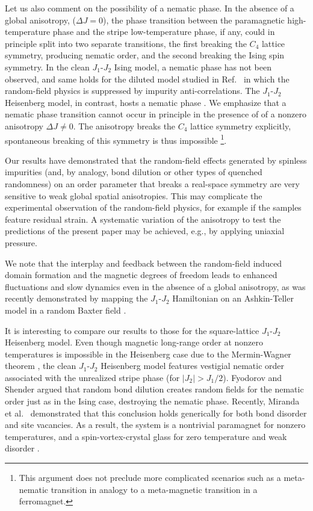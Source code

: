 \documentclass[twocolumn,showpacs,superscriptaddress,aps,prb]{revtex4-2}
\begin{document}
Let us also comment on the possibility of a nematic phase. In the absence of a global anisotropy,
($\Delta J = 0$), the phase transition between the paramagnetic high-temperature phase and the
stripe low-temperature phase, if any, could in principle split into two separate transitions,
the first breaking the $C_4$ lattice symmetry, producing nematic order, and the second breaking the
Ising spin symmetry. In the clean $J_1$-$J_2$ Ising model, a nematic phase has not been observed,
and same holds for the diluted model studied in Ref.\ \cite{KunwarSenVojtaNarayanan18} in which
the random-field physics is suppressed by impurity anti-correlations. The $J_1$-$J_2$ Heisenberg
model, in contrast, hosts a nematic phase \cite{ChandraColemanLarkin90}.
We emphasize that a nematic phase transition cannot occur in principle in the presence of
of a nonzero anisotropy $\Delta J \ne 0$. The anisotropy breaks the $C_4$ lattice symmetry
explicitly, spontaneous breaking of this symmetry is thus impossible \footnote{This argument does not preclude
more complicated scenarios such as a meta-nematic transition in analogy to a meta-magnetic transition
in a ferromagnet.}.

Our results have demonstrated that the random-field effects generated by spinless impurities
(and, by analogy, bond dilution or other types of quenched randomness)
on an order parameter that breaks a real-space symmetry are very sensitive to weak global spatial
anisotropies. This may complicate the experimental observation of the random-field physics, for
example if the samples feature residual strain. A systematic variation of the anisotropy to test the
predictions of the present paper may be achieved, e.g., by applying uniaxial pressure.

We note that the interplay and feedback between the random-field induced domain formation
and the magnetic degrees of freedom leads to enhanced fluctuations and slow dynamics even in the absence
of a global anisotropy, as was recently demonstrated by mapping the $J_1$-$J_2$ Hamiltonian on an
Ashkin-Teller model in a random Baxter field \cite{MeeseVojtaFernandes21}.

It is interesting to compare our results to those for the square-lattice $J_1$-$J_2$ Heisenberg model.
Even though magnetic long-range order at nonzero temperatures is impossible in the Heisenberg case
due to the Mermin-Wagner theorem \cite{MerminWagner66}, the clean $J_1$-$J_2$ Heisenberg model
features vestigial nematic order \cite{ChandraColemanLarkin90} associated with the unrealized
stripe phase (for $|J_2| > J_1/2$). Fyodorov and Shender \cite{FyodorovShender91} argued that
random bond dilution creates random fields for the nematic order just as in the Ising case,
destroying the nematic phase. Recently, Miranda et al.\ \cite{Mirandaetal21} demonstrated that this conclusion
holds generically for both bond disorder and site vacancies.
As a result, the system is a nontrivial paramagnet for nonzero temperatures, and a spin-vortex-crystal
glass for zero temperature and weak disorder \cite{Mirandaetal21}.
\end{document}

